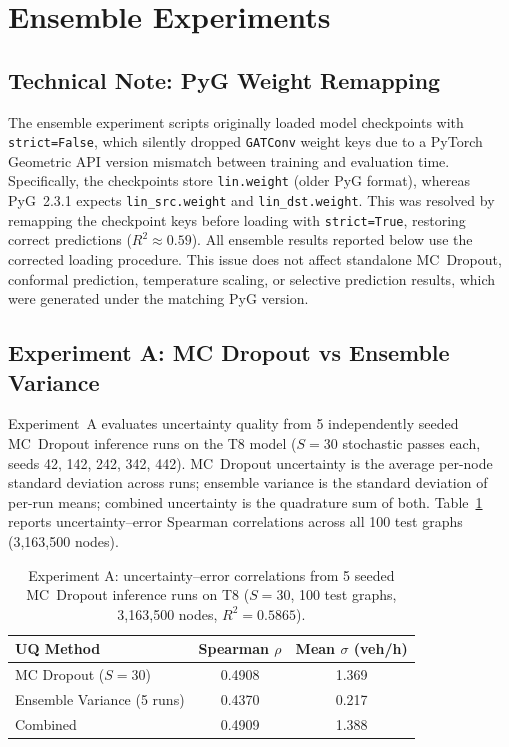 \section{Ensemble Experiments}

\subsection{Technical Note: PyG Weight Remapping}
\label{sec:ensemble_caveat}

The ensemble experiment scripts originally loaded model checkpoints with \texttt{strict=False}, which silently dropped \texttt{GATConv} weight keys due to a PyTorch Geometric API version mismatch between training and evaluation time.  Specifically, the checkpoints store \texttt{lin.weight} (older PyG format), whereas PyG~2.3.1 expects \texttt{lin\_src.weight} and \texttt{lin\_dst.weight}.  This was resolved by remapping the checkpoint keys before loading with \texttt{strict=True}, restoring correct predictions ($R^2 \approx 0.59$).  All ensemble results reported below use the corrected loading procedure.  This issue does not affect standalone MC~Dropout, conformal prediction, temperature scaling, or selective prediction results, which were generated under the matching PyG version.

\subsection{Experiment A: MC Dropout vs Ensemble Variance}

Experiment~A evaluates uncertainty quality from 5 independently seeded MC~Dropout inference runs on the T8 model ($S = 30$ stochastic passes each, seeds 42, 142, 242, 342, 442).  MC~Dropout uncertainty is the average per-node standard deviation across runs; ensemble variance is the standard deviation of per-run means; combined uncertainty is the quadrature sum of both.  Table~\ref{tab:exp_a_results} reports uncertainty--error Spearman correlations across all 100 test graphs (3,163,500 nodes).

\begin{table}[htbp]
\centering
\caption[Experiment A: MC Dropout vs ensemble variance (Spearman~$\rho$)]{Experiment A: uncertainty--error correlations from 5 seeded MC~Dropout inference runs on T8 ($S = 30$, 100 test graphs, 3,163,500 nodes, $R^2 = 0.5865$).}
\label{tab:exp_a_results}
\begin{tabular}{lcc}
\toprule
\textbf{UQ Method} & \textbf{Spearman $\rho$} & \textbf{Mean $\sigma$ (veh/h)} \\
\midrule
MC Dropout ($S=30$) & 0.4908 & 1.369 \\
Ensemble Variance (5 runs) & 0.4370 & 0.217 \\
Combined & 0.4909 & 1.388 \\
\bottomrule
\end{tabular}
\end{table}

